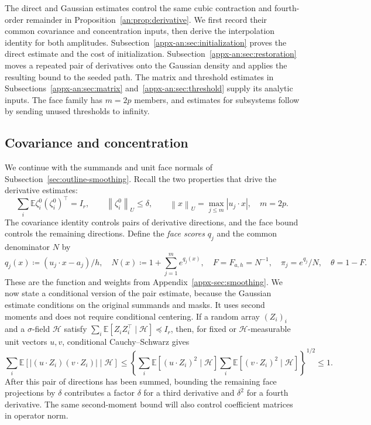 \documentclass[11pt,letterpaper]{article}
\theoremstyle{remark}
\newcommand{\E}{\mathbb E}
\newcommand{\norm}[1]{\left\lVert#1\right\rVert}
\begin{document}
The direct and Gaussian estimates control the same cubic contraction
and fourth-order remainder in Proposition~\ref{an:prop:derivative}.
We first record their common covariance and concentration inputs,
then derive the interpolation identity for both amplitudes.
Subsection~\ref{appx-an:sec:initialization} proves the
direct estimate and the cost of initialization. Subsection~\ref{appx-an:sec:restoration}
moves a repeated pair of derivatives onto the Gaussian density and
applies the resulting bound to the seeded path.
The matrix and threshold estimates in Subsections~\ref{appx-an:sec:matrix}
and~\ref{appx-an:sec:threshold} supply its analytic inputs. The face
family has \(m=2p\) members, and estimates for subsystems follow by
sending unused thresholds to infinity.

\subsection{Covariance and concentration}
\label{appx-an:sec:coords}

We continue with the summands and unit face normals of
Subsection~\ref{sec:outline-smoothing}. Recall the two properties
that drive the derivative estimates:
\begin{equation}
 \sum_i\E\zeta_i^0(\zeta_i^0)^\top=I_r,
 \qquad \norm{\zeta_i^0}_U\le\delta,
 \qquad \norm x_U=\max_{j\le m}|u_j\cdot x|,
 \quad m=2p.
 \label{appx-eq:projected-bound}
\end{equation}
The covariance identity controls pairs of derivative directions,
and the face bound controls the remaining directions. Define the
\emph{face scores} \(q_j\) and the common denominator \(N\) by
\begin{equation}
 \label{appx-an:basic-notation}
 q_j(x)\coloneqq(u_j\cdot x-a_j)/h,\quad
 N(x)\coloneqq1+\sum_{j=1}^m e^{q_j(x)},\quad
 F=F_{a,h}=N^{-1},\quad\pi_j=e^{q_j}/N,\quad\theta=1-F.
\end{equation}
These are the function and weights from Appendix~\ref{appx-sec:smoothing}.
We now state a conditional version of the pair estimate, because
the Gaussian estimate conditions on the original summands and masks.
It uses second moments and does not require conditional centering. If a random array \((Z_i)_i\)
and a \(\sigma\)-field \(\mathcal H\) satisfy
\(\sum_i\E[Z_iZ_i^\top\mid\mathcal H]\preceq I_r\), then, for
fixed or \(\mathcal H\)-measurable unit vectors \(u,v\),
conditional Cauchy--Schwarz gives
\begin{equation}
 \sum_i\E[|(u\cdot Z_i)(v\cdot Z_i)|\mid\mathcal H]
 \le\left\{\sum_i\E[(u\cdot Z_i)^2\mid\mathcal H]
           \sum_i\E[(v\cdot Z_i)^2\mid\mathcal H]\right\}^{1/2}
 \le1.
 \label{appx-an:pair-contraction}
\end{equation}
After this pair of directions has been summed, bounding the remaining
face projections by \(\delta\) contributes a factor \(\delta\)
for a third derivative and \(\delta^2\) for a fourth derivative.
The same second-moment bound will also control coefficient matrices
in operator norm.
\end{document}
